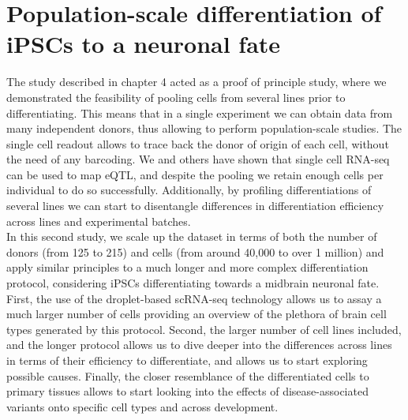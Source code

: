 
\chapter{Population-scale differentiation of iPSCs to a neuronal fate}
\label{chapter5}

The study described in chapter 4 acted as a proof of principle study, where we demonstrated the feasibility of pooling cells from several lines prior to differentiating.
This means that in a single experiment we can obtain data from many independent donors, thus allowing to perform population-scale studies.
The single cell readout allows to trace back the donor of origin of each cell, without the need of any barcoding.
We and others have shown that single cell RNA-seq can be used to map eQTL, and despite the pooling we retain enough cells per individual to do so successfully.
Additionally, by profiling differentiations of several lines we can start to disentangle differences in differentiation efficiency across lines and experimental batches. \\

In this second study, we scale up the dataset in terms of both the number of donors (from 125 to 215) and cells (from around 40,000 to over 1 million) and apply similar principles to a much longer and more complex differentiation protocol, considering iPSCs differentiating towards a midbrain neuronal fate.
First, the use of the droplet-based scRNA-seq technology allows us to assay a much larger number of cells providing an overview of the plethora of brain cell types generated by this protocol. 
Second, the larger number of cell lines included, and the longer protocol allows us to dive deeper into the differences across lines in terms of their efficiency to differentiate, and allows us to start exploring possible causes.
Finally, the closer resemblance of the differentiated cells to primary tissues allows to start looking into the effects of disease-associated variants onto specific cell types and across development. 

